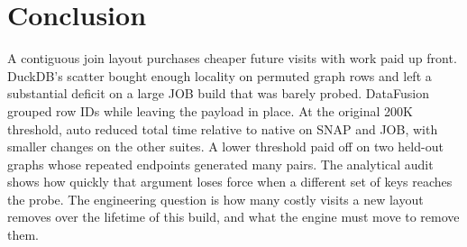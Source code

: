 \documentclass[11pt,a4paper]{article}
\begin{document}
\section{Conclusion}
A contiguous join layout purchases cheaper future visits with work paid up front. DuckDB's scatter
bought enough locality on permuted graph rows and left a substantial deficit on a large JOB build
that was barely probed. DataFusion grouped row IDs while leaving the payload in place. At the
original 200K threshold, auto reduced total time relative to native on SNAP and JOB, with smaller
changes on the other suites. A lower threshold paid off on two held-out graphs whose repeated
endpoints generated many pairs. The analytical
audit shows how quickly that argument loses force when a different set of keys reaches the probe.
The engineering question is how many costly visits a new layout removes over the lifetime of this
build, and what the engine must move to remove them.

\small


\end{document}
